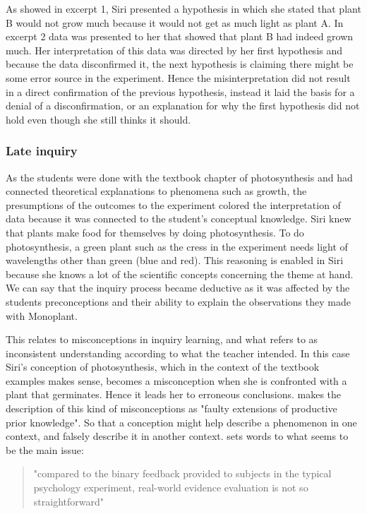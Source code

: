 As showed in excerpt 1, Siri presented a hypothesis in which she stated that plant B would not grow much because it would not get as much light as plant A. In excerpt 2 data was presented to her that showed that plant B had indeed grown much. Her interpretation of this data was directed by her first hypothesis and because the data disconfirmed it, the next hypothesis is claiming there might be some error source in the experiment. Hence the misinterpretation did not result in a direct confirmation of the previous hypothesis, instead it laid the basis for a denial of a disconfirmation, or an explanation for why the first hypothesis did not hold even though she still thinks it should.

\subsubsection*{Late inquiry}
As the students were done with the textbook chapter of photosynthesis and had connected theoretical explanations to phenomena such as growth, the presumptions of the outcomes to the experiment colored the interpretation of data because it was connected to the student's conceptual knowledge. Siri knew that plants make food for themselves by doing photosynthesis. To do photosynthesis, a green plant such as the cress in the experiment needs light of wavelengths other than green (blue and red). This reasoning is enabled in Siri because she knows a lot of the scientific concepts concerning the theme at hand. We can say that the inquiry process became deductive as it was affected by the students preconceptions and their ability to explain the observations they made with Monoplant. 

This relates to misconceptions in inquiry learning, and what \citet{gomez2008elementary} refers to as inconsistent understanding according to what the teacher intended. In this case Siri's conception of photosynthesis, which in the context of the textbook examples makes sense, becomes a misconception when she is confronted with a plant that germinates. Hence it leads her to erroneous conclusions. \citet{smith1994misconceptions} makes the description of this kind of misconceptions as "faulty extensions of productive prior knowledge". So that a conception might help describe a phenomenon in one context, and falsely describe it in another context. \citeauthor{klahr1993heuristics} sets words to what seems to be the main issue: 

\begin{quote}"compared to the binary feedback provided to subjects in the typical psychology experiment, real-world evidence evaluation is not so straightforward" \citetext{\citet[p. 114]{klahr1993heuristics}, referenced in \citealp{de1998scientific}}
\end{quote}

